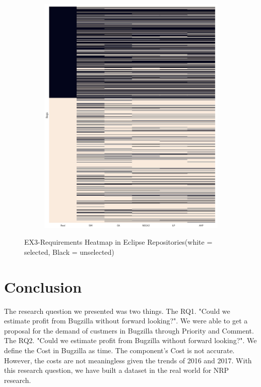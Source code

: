 \begin{figure}[h]
\centering
  \begin{subfigure}[b]{0.95\linewidth}
    \includegraphics[width=\linewidth]{images/heatmap_ec.png}
  \end{subfigure}
  \caption{EX3-Requirements Heatmap in Eclipse Repositories(white = selected, Black = unselected)}
  \label{fig:EclipseHeatmap}
\end{figure}

\section{Conclusion}
The research question we presented was two things.
The RQ1. "Could we estimate profit from Bugzilla without forward looking?". We were able to get a proposal for the demand of custmers in Bugzilla through Priority and Comment. The RQ2. "Could we estimate profit from Bugzilla without forward looking?". We define the Cost in Bugzilla as time. The component's Cost is not accurate. However, the costs are not meaningless given the trends of 2016 and 2017. With this research question, we have built a dataset in the real world for NRP research.

